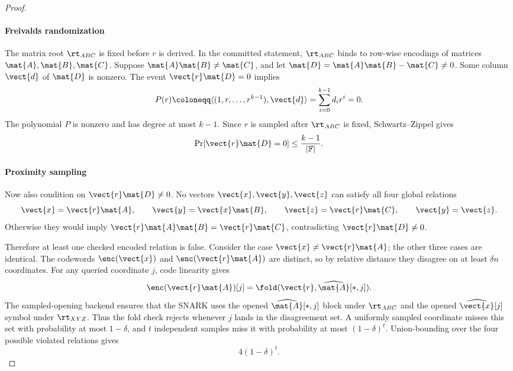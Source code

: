 \begin{proof}
\paragraph{Freivalds randomization}
The matrix root \(\rt_{ABC}\) is fixed before \(r\) is derived. 
In the committed statement, \(\rt_{ABC}\) binds to row-wise encodings of matrices
\(\mat{A},\mat{B},\mat{C}\).
Suppose
\(\mat{A}\mat{B}\neq\mat{C}\), and let
\(\mat{D}=\mat{A}\mat{B}-\mat{C}\neq 0\).  Some column
\(\vect{d}\) of \(\mat{D}\) is nonzero.  The event
\(\vect{r}\mat{D}=0\) implies
\[
  P(r)
  \coloneqq
  \langle (1,r,\ldots,r^{k-1}),\vect{d}\rangle
  =
  \sum_{i=0}^{k-1} d_i r^i
  =
  0 .
\]
The polynomial \(P\) is nonzero and has degree at most \(k-1\).  Since \(r\)
is sampled after \(\rt_{ABC}\) is fixed, Schwartz--Zippel gives
\[
  \Pr[\vect{r}\mat{D}=0]
  \le
  \frac{k-1}{|\mathbb{F}|}.
\]

\paragraph{Proximity sampling}
Now also condition on \(\vect{r}\mat{D}\neq 0\).  No vectors
\(\vect{x},\vect{y},\vect{z}\) can satisfy all four global relations
\[
  \vect{x}=\vect{r}\mat{A},
  \qquad
  \vect{y}=\vect{x}\mat{B},
  \qquad
  \vect{z}=\vect{r}\mat{C},
  \qquad
  \vect{y}=\vect{z}.
\]
Otherwise they would imply
\(\vect{r}\mat{A}\mat{B}=\vect{r}\mat{C}\), contradicting
\(\vect{r}\mat{D}\neq 0\).

Therefore at least one checked encoded relation is false.  Consider the case
\(\vect{x}\neq\vect{r}\mat{A}\); the other three cases are identical.  The
codewords \(\enc(\vect{x})\) and \(\enc(\vect{r}\mat{A})\) are distinct, so by
relative distance they disagree on at least \(\delta n\) coordinates.  For any
queried coordinate \(j\), code linearity gives
\[
  \enc(\vect{r}\mat{A})[j]
  =
  \fold(\vect{r},\widehat{\mat{A}}[*,j]).
\]
The sampled-opening backend ensures that the SNARK uses the opened
\(\widehat{\mat{A}}[*,j]\) block under \(\rt_{ABC}\) and the opened
\(\widehat{\vect{x}}[j]\) symbol under \(\rt_{XYZ}\).  Thus the fold check
rejects whenever \(j\) lands in the disagreement set.  A uniformly sampled
coordinate misses this set with probability at most \(1-\delta\), and \(t\)
independent samples miss it with probability at most \((1-\delta)^t\).
Union-bounding over the four possible violated relations gives
\[
  4(1-\delta)^t .
\]


\end{proof}
